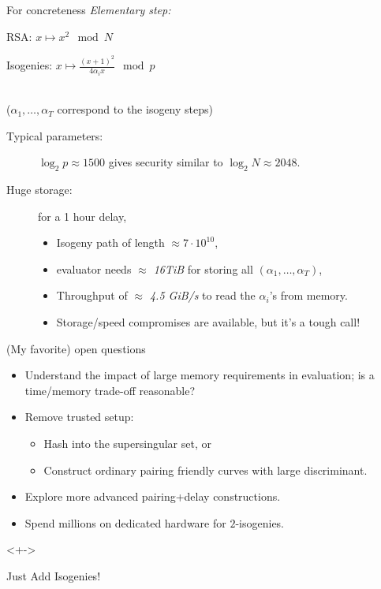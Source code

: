 \documentclass[aspectratio=169]{beamer}
\begin{document}
\begin{frame}{For concreteness}
  \emph{Elementary step:}
  \medskip
  
  \hspace{2em} RSA: \hfill $x \longmapsto x^2\mod N$ \hspace{4em}

  \vfill
  \hspace{2em} Isogenies: \hfill $\displaystyle x \longmapsto \frac{(x+1)^2}{4\alpha_ix}\mod p$ \hspace{4em}\strut\\
  {\hspace{2em}\normalsize\color{gray} ($\alpha_1,\dots,\alpha_T$ correspond to the isogeny steps)}

  \vfill
  \begin{description}
  \item[Typical parameters:] \emph{$\log_2 p \approx 1500$} gives
    security similar to $\log_2 N \approx 2048$.
  \item[Huge storage:] for a 1 hour delay,
    \begin{itemize}
    \item Isogeny path of length \emph{$\approx 7 \cdot 10^{10}$},
    \item evaluator needs \emph{$\approx$ 16TiB} for storing all
      $(\alpha_1,\dots,\alpha_T)$,
    \item Throughput of \emph{$\approx$ 4.5 GiB/s} to read the
      $\alpha_i$'s from memory.
    \item Storage/speed compromises are available, but it's a tough call!
    \end{itemize}
  \end{description}
\end{frame}


\begin{frame}{(My favorite) open questions}
  \begin{itemize}
  \item Understand the impact of large memory requirements in
    evaluation; is a time/memory trade-off reasonable?
  \item Remove trusted setup:
    \begin{itemize}
    \item Hash into the supersingular set, or
    \item Construct ordinary pairing friendly curves with large
      discriminant.
    \end{itemize}
  \item Explore more advanced pairing+delay constructions.
  \item Spend millions on dedicated hardware for $2$-isogenies.
  \end{itemize}

  \bigskip
  \begin{uncoverenv}<+->
    \begin{center}
      \Large Just Add Isogenies\texttrademark!
    \end{center}
  \end{uncoverenv}
\end{frame}
\end{document}
